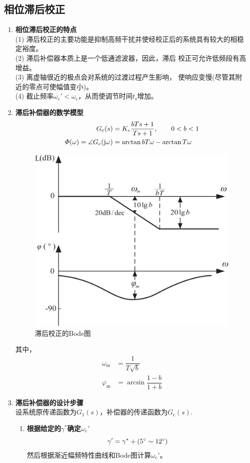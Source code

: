\subsection{相位滞后校正}\vspace*{-0.5em}
\begin{enumerate}[1. ]
	\item \textbf{相位滞后校正的特点}\\
	(1) 滞后校正的主要功能是抑制高频干扰并使经校正后的系统具有较大的相稳定裕度。\\
	(2) 滞后补偿器本质上是一个低通滤波器，因此，滞后 校正可允许低频段有高增益。\\
	(3) 离虚轴很近的极点会对系统的过渡过程产生影响， 使响应变慢(尽管其附近的零点可使幅值变小)。\\
	(4) 截止频率$\omega_{\text{c}}' < \omega_{\text{c}}$，从而使调节时间$t_\text{s}$增加。
	
	\item \textbf{滞后补偿器的数学模型}
	\begin{align}
		G_{\text{c}}(s) &= K_c \dfrac{bTs + 1}{Ts + 1}, \quad \quad 0 < b < 1\\
		\varPhi(\omega) = \angle G_{\text{c}}(\text{j} \omega) &= \arctan bT\omega - \arctan T\omega
	\end{align}
	
	\begin{figure}[!htb]
		\centering
		\includegraphics[width=0.55\linewidth]{pic/滞后bode.pdf}
		\vspace*{-1em}
		\caption{滞后校正的Bode图}
		\label{滞后Bode}
	\end{figure}
	其中，
	\begin{align}
		\omega_\text{m} &= \dfrac{1}{T \sqrt{b}}\\
		\varphi_\text{m} &= \arcsin \dfrac{1 - b}{1 + b}
	\end{align}
	
	\item \textbf{滞后补偿器的设计步骤}\\
	设系统原传递函数为$G_1(s)$，补偿器的传递函数为$G_\text{c}(s)$.\vspace*{-0.5em}
	\begin{enumerate}[\textbf{步骤} 1 ]
		\item \textbf{根据给定的$\gamma^*$确定$\omega_{\text{c}}'$}
		\begin{equation}
			\gamma' = \gamma^* + (5{}^{\circ} \sim 12 {}^{\circ})
		\end{equation}
		然后根据渐近幅频特性曲线和Bode图计算$\omega_{\text{c}}'$。
		

\end{enumerate}
\end{enumerate}
